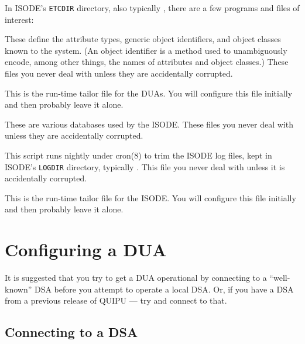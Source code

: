 In ISODE's \verb"ETCDIR" directory,
also typically ,
there are a few programs and files of interest:
\begin{describe}\sloppy
\item[\verb+oidtable.at+, \verb+oidtable.gen+, \verb+oidtable.oc+:]

			These define the attribute types,
			generic object identifiers,
			and object classes known to the system.
			(An object identifier is a method used to unambiguously
			encode, among other things,
			the names of attributes and object classes.)
			These files you never deal with unless they are
			accidentally corrupted.
			
\item[\verb+dsaptailor+:]	

			This is the run-time tailor file for the DUAs.
			You will configure this file initially and then
			probably leave it alone.


\item[\verb+isoaliases+, \verb+isobjects+, \verb+isoentities+, \verb+isomacros+, \verb+isoservices+:]

			These are 
			various databases used by the ISODE.
			These files you never deal with unless they are
			accidentally corrupted.

\item[\verb+isologs+:]

			This script runs nightly under \man cron(8) to
			trim the ISODE log files, kept in ISODE's \verb"LOGDIR"
			directory,
			typically .
			This file you never deal with unless it is
			accidentally corrupted.

\item[\verb+isotailor+:]	

			This is the run-time tailor file for the ISODE.
			You will configure this file initially and then
			probably leave it alone.
\end{describe}

\chapter {Configuring a DUA}

It is suggested that you try to get a DUA operational by connecting to
a ``well-known'' DSA before you attempt
to operate a local DSA.
Or, if you have a DSA from a previous release of QUIPU --- try and connect to
that.

\section {Connecting to a DSA}
\label{dua:connect}

